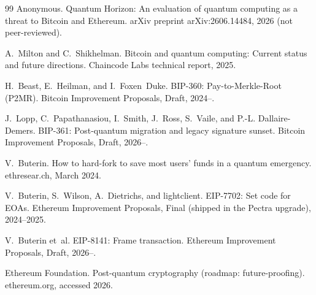 \begin{thebibliography}{99}
 Anonymous.
\newblock Quantum Horizon: An evaluation of quantum computing as a threat to Bitcoin and Ethereum.
\newblock arXiv preprint arXiv:2606.14484, 2026 (not peer-reviewed).

 A.~Milton and C.~Shikhelman.
\newblock Bitcoin and quantum computing: Current status and future directions.
\newblock Chaincode Labs technical report, 2025.

 H.~Beast, E.~Heilman, and I.~Foxen~Duke.
\newblock BIP-360: Pay-to-Merkle-Root (P2MR).
\newblock Bitcoin Improvement Proposals, Draft, 2024--.

 J.~Lopp, C.~Papathanasiou, I.~Smith, J.~Ross, S.~Vaile, and P.-L. Dallaire-Demers.
\newblock BIP-361: Post-quantum migration and legacy signature sunset.
\newblock Bitcoin Improvement Proposals, Draft, 2026--.

 V.~Buterin.
\newblock How to hard-fork to save most users' funds in a quantum emergency.
\newblock ethresear.ch, March 2024.

 V.~Buterin, S.~Wilson, A.~Dietrichs, and lightclient.
\newblock EIP-7702: Set code for EOAs.
\newblock Ethereum Improvement Proposals, Final (shipped in the Pectra upgrade), 2024--2025.

 V.~Buterin et~al.
\newblock EIP-8141: Frame transaction.
\newblock Ethereum Improvement Proposals, Draft, 2026--.

 Ethereum Foundation.
\newblock Post-quantum cryptography (roadmap: future-proofing).
\newblock ethereum.org, accessed 2026.

\end{thebibliography}
